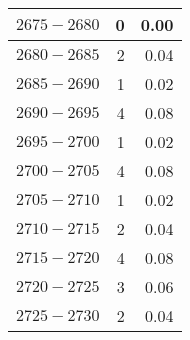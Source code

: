 \begin{longtable}{|l|r|r|}
		{\color[HTML]{000000} $ 2675 - 2680 $} & {\color[HTML]{000000} 0}                                                      & {\color[HTML]{000000} 0.00}                                                     \\ \hline
		{\color[HTML]{000000} $ 2680 - 2685 $} & {\color[HTML]{000000} 2}                                                      & {\color[HTML]{000000} 0.04}                                                     \\ \hline
		{\color[HTML]{000000} $ 2685 - 2690 $} & {\color[HTML]{000000} 1}                                                      & {\color[HTML]{000000} 0.02}                                                     \\ \hline
		{\color[HTML]{000000} $ 2690 - 2695 $} & {\color[HTML]{000000} 4}                                                      & {\color[HTML]{000000} 0.08}                                                     \\ \hline
		{\color[HTML]{000000} $ 2695 - 2700 $} & {\color[HTML]{000000} 1}                                                      & {\color[HTML]{000000} 0.02}                                                     \\ \hline
		{\color[HTML]{000000} $ 2700 - 2705 $} & {\color[HTML]{000000} 4}                                                      & {\color[HTML]{000000} 0.08}                                                     \\ \hline
		{\color[HTML]{000000} $ 2705 - 2710 $} & {\color[HTML]{000000} 1}                                                      & {\color[HTML]{000000} 0.02}                                                     \\ \hline
		{\color[HTML]{000000} $ 2710 - 2715 $} & {\color[HTML]{000000} 2}                                                      & {\color[HTML]{000000} 0.04}                                                     \\ \hline
		{\color[HTML]{000000} $ 2715 - 2720 $} & {\color[HTML]{000000} 4}                                                      & {\color[HTML]{000000} 0.08}                                                     \\ \hline
		{\color[HTML]{000000} $ 2720 - 2725 $} & {\color[HTML]{000000} 3}                                                      & {\color[HTML]{000000} 0.06}                                                     \\ \hline
		{\color[HTML]{000000} $ 2725 - 2730 $} & {\color[HTML]{000000} 2}                                                      & {\color[HTML]{000000} 0.04}                                                     \\ \hline

\end{longtable}
